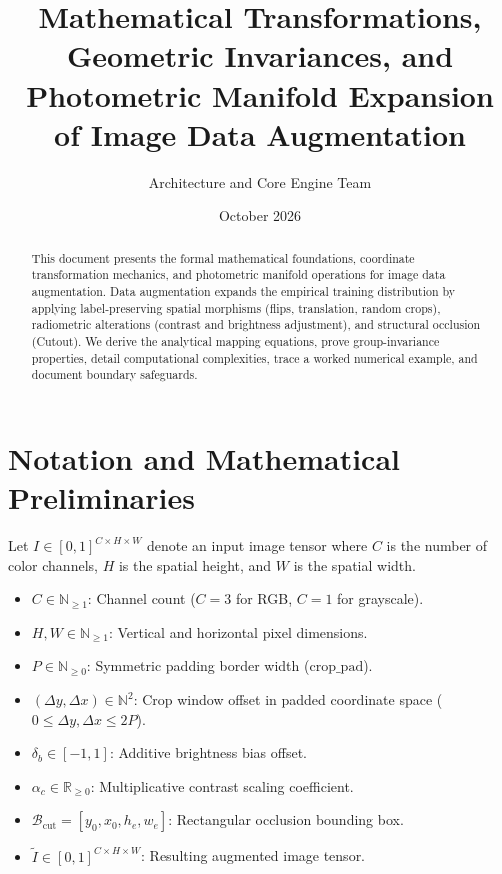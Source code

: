 \documentclass[11pt,a4paper]{article}
\title{\textbf{Mathematical Transformations, Geometric Invariances, and Photometric Manifold Expansion of Image Data Augmentation}}
\author{Architecture and Core Engine Team}
\date{October 2026}
\theoremstyle{definition}
\begin{document}
\maketitle

\begin{abstract}
This document presents the formal mathematical foundations, coordinate transformation mechanics, and photometric manifold operations for image data augmentation. Data augmentation expands the empirical training distribution by applying label-preserving spatial morphisms (flips, translation, random crops), radiometric alterations (contrast and brightness adjustment), and structural occlusion (Cutout). We derive the analytical mapping equations, prove group-invariance properties, detail computational complexities, trace a worked numerical example, and document boundary safeguards.
\end{abstract}

\section{Notation and Mathematical Preliminaries}

Let $I \in [0, 1]^{C \times H \times W}$ denote an input image tensor where $C$ is the number of color channels, $H$ is the spatial height, and $W$ is the spatial width.

\begin{itemize}
    \item $C \in \mathbb{N}_{\ge 1}$: Channel count ($C = 3$ for RGB, $C = 1$ for grayscale).
    \item $H, W \in \mathbb{N}_{\ge 1}$: Vertical and horizontal pixel dimensions.
    \item $P \in \mathbb{N}_{\ge 0}$: Symmetric padding border width ($\text{crop\_pad}$).
    \item $(\Delta y, \Delta x) \in \mathbb{N}^2$: Crop window offset in padded coordinate space ($0 \le \Delta y, \Delta x \le 2P$).
    \item $\delta_b \in [-1, 1]$: Additive brightness bias offset.
    \item $\alpha_c \in \mathbb{R}_{\ge 0}$: Multiplicative contrast scaling coefficient.
    \item $\mathcal{B}_{\text{cut}} = [y_0, x_0, h_e, w_e]$: Rectangular occlusion bounding box.
    \item $\tilde{I} \in [0, 1]^{C \times H \times W}$: Resulting augmented image tensor.
\end{itemize}
\end{document}

